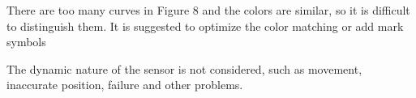 \begin{revcomment}
	There are too many curves in Figure 8 and the colors are similar, so it is difficult to distinguish them. It is suggested to optimize the color matching or add mark symbols
\end{revcomment}
\begin{revresponse}
	
\end{revresponse}

\begin{revcomment}
	The dynamic nature of the sensor is not considered, such as movement, inaccurate position, failure and other problems.
\end{revcomment}
\begin{revresponse}
	
\end{revresponse}

